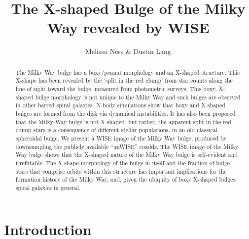 \documentclass[12pt, preprint]{aastex}
\begin{document}
\title{The X-shaped Bulge of the Milky Way revealed by WISE}
\author{%
Melissa Ness \& %
Dustin Lang
}
%
\begin{abstract}%
The Milky Way bulge has a boxy/peanut morphology and an X-shaped structure. This X-shape has been revealed by the `split in the red clump' from 
star counts along the line of sight toward the bulge, measured from photometric surveys. This boxy, X-shaped bulge morphology is not unique to the Milky Way and such bulges are observed in other barred spiral galaxies.  N-body simulations show that boxy and X-shaped bulges are formed from the disk via dynamical instabilities.  It has also been proposed that the Milky Way bulge is not X-shaped, but rather, the apparent split in the red clump stars is a consequence of different stellar populations, in an old classical spheroidal bulge. We present a WISE image of the Milky Way bulge, produced by downsampling the publicly available ``unWISE'' coadds. The WISE image of the Milky Way bulge shows that the X-shaped nature of the Milky Way bulge is self-evident and irrefutable. The X-shape morphology of the bulge in itself and the fraction of bulge stars that comprise orbits within this structure has important implications for the formation history of the Milky Way, and, given the ubiquity of boxy X-shaped bulges, spiral galaxies in general. 
\end{abstract}



\keywords{%
}

\section{Introduction}\label{sec:Intro}
\end{document}
